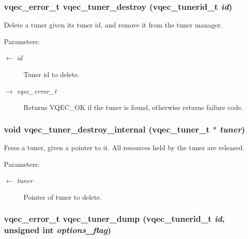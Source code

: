 \subsubsection{\setlength{\rightskip}{0pt plus 5cm}vqec\_\-error\_\-t vqec\_\-tuner\_\-destroy (vqec\_\-tunerid\_\-t {\em id})}\label{vqec__tuner_8c_ad632acb656a21299365a822605b40e2}


Delete a tuner given its tuner id, and remove it from the tuner manager.

\begin{Desc}
\item[Parameters:]
\begin{description}
\item[\mbox{$\leftarrow$} {\em id}]Tuner id to delete. \item[\mbox{$\rightarrow$} {\em vqec\_\-error\_\-t}]Returns VQEC\_\-OK if the tuner is found, otherwise returns failure code. \end{description}
\end{Desc}
\subsubsection{\setlength{\rightskip}{0pt plus 5cm}void vqec\_\-tuner\_\-destroy\_\-internal (\bf{vqec\_\-tuner\_\-t} $\ast$ {\em tuner})}\label{vqec__tuner_8c_216a46b431c1d512d908ccdd27cd6ddc}


Frees a tuner, given a pointer to it. All resources held by the tuner are released.

\begin{Desc}
\item[Parameters:]
\begin{description}
\item[\mbox{$\leftarrow$} {\em tuner}]Pointer of tuner to delete. \end{description}
\end{Desc}
\subsubsection{\setlength{\rightskip}{0pt plus 5cm}vqec\_\-error\_\-t vqec\_\-tuner\_\-dump (vqec\_\-tunerid\_\-t {\em id}, unsigned int {\em options\_\-flag})}\label{vqec__tuner_8c_00204a54177684b6cc97b76589710260}


